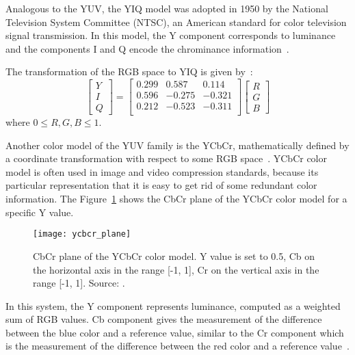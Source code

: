 Analogous to the YUV, the YIQ model was adopted in 1950 by the National Television System Committee (NTSC), an American standard for color television signal transmission. In this model, the Y component corresponds to luminance and the components I and Q encode the chrominance information~\citep{pedrini:08}.

The transformation of the RGB space to YIQ is given by~\citep{pedrini:08}:\\
\begin{equation}
  \begin{bmatrix}
    Y \\ I \\ Q
  \end{bmatrix} = 
  \begin{bmatrix}
    0.299  &  0.587 &  0.114 \\
    0.596  & -0.275 & -0.321 \\
    0.212  & -0.523 & -0.311 \\
  \end{bmatrix}
  \begin{bmatrix}
    R \\ G \\ B
  \end{bmatrix}
\end{equation}
where $0 \leq R, G, B \leq 1$.

Another color model of the YUV family is the YCbCr, mathematically defined by a coordinate transformation with respect to some RGB space~\citep{pedrini:08}. YCbCr color model is often used in image and video compression standards, because its particular representation that it is easy to get rid of some redundant color information. The Figure~\ref{fig:ycbcr-model} shows the CbCr plane of the YCbCr color model for a specific Y value.

\begin{figure}[!htb]
  \centering
  \texttt{[image: ycbcr\_plane]}
  \caption[CbCr plane of the YCbCr color model]{CbCr plane of the YCbCr color model. Y value is set to 0.5, Cb on the horizontal axis in the range [-1, 1], Cr on the vertical axis in the range [-1, 1]. Source: \citet{eugster:10}.}
  \label{fig:ycbcr-model}
\end{figure}

In this system, the Y component represents luminance, computed as a weighted sum of RGB values. Cb component gives the measurement of the difference between the blue color and a reference value, similar to the Cr component which is the measurement of the difference between the red color and a reference value~\citep{pedrini:08}.

